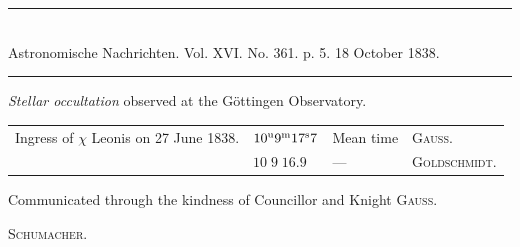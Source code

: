 \clearpage
\hypertarget{native-468-occultation}{}
\begin{center}
\rule{0.55\linewidth}{0.4pt}\\[2pt]
Astronomische Nachrichten. Vol. XVI. No. 361. p. 5. 18 October 1838.\\[2pt]
\rule{0.55\linewidth}{0.4pt}
\end{center}

\begin{center}\emph{Stellar occultation} observed at the Göttingen Observatory.\end{center}

\begin{center}
\setlength{\tabcolsep}{1pt}
\begin{tabular}{llll}
Ingress of $\chi$ Leonis on 27 June 1838. & $10^{\rm u}9^{\rm m}17^{\rm s}7$ & Mean time & \textsc{Gauss.} \\
 & $10\;9\;16.9$ & --- & \textsc{Goldschmidt.} \\
\end{tabular}
\end{center}

Communicated through the kindness of Councillor and Knight \textsc{Gauss}.
\begin{flushright}\textsc{Schumacher.}\end{flushright}
